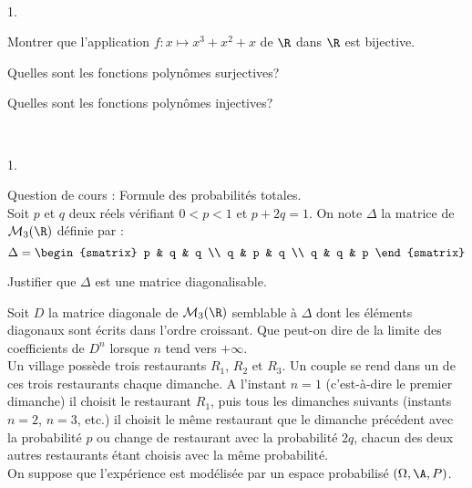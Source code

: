 \documentclass[11pt]{article}%
\begin{document}
\begin{exerciceSP}~
  \begin{noliste}{1.}
    \setlength{\itemsep}{2mm}
  \item Montrer que l'application $f : x \mapsto x^3 + x^2 + x$ de
    $\R$ dans $\R$ est bijective.
  \item Quelles sont les fonctions polynômes surjectives?
  \item Quelles sont les fonctions polynômes injectives?
  \end{noliste}
\end{exerciceSP}


\newpage


\begin{exerciceAP}~
  \begin{noliste}{1.}
    \setlength{\itemsep}{2mm}
  \item Question de cours : Formule des probabilités totales.\\
    Soit $p$ et $q$ deux réels vérifiant $0<p<1$ et $p+2q=1$. On note
    $\Delta$ la matrice de $\mathcal{M}_3 ( \R )$ définie par :
    \[
    \Delta = 
    \begin{smatrix} 
      p & q & q \\ 
      q & p & q \\ 
      q & q & p 
    \end{smatrix}
    \]

  \item Justifier que $\Delta$ est une matrice diagonalisable.

  \item Soit $D$ la matrice diagonale de $\mathcal{M}_3 ( \R )$
    semblable à $\Delta$ dont les éléments diagonaux sont écrits dans
    l'ordre croissant. Que peut-on dire de la limite des coefficients
    de $D^n$ lorsque $n$ tend vers $+\infty$.\\

    Un village possède trois restaurants $R_1$, $R_2$ et $R_3$. Un
    couple se rend dans un de ces trois restaurants chaque dimanche. A
    l'instant $n=1$ (c'est-à-dire le premier dimanche) il choisit le
    restaurant $R_1$, puis tous les dimanches suivants (instants
    $n=2$, $n=3$, etc.) il choisit le même restaurant que le dimanche
    précédent avec la probabilité $p$ ou change de restaurant avec la
    probabilité $2q$, chacun des deux autres restaurants étant choisis
    avec la même probabilité.\\

    On suppose que l'expérience est modélisée par un espace
    probabilisé $(\Omega , \A , P)$.


\end{noliste}
\end{exerciceAP}
\end{document}
